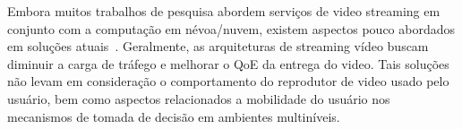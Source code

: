 Embora muitos trabalhos de pesquisa abordem serviços de video streaming em conjunto com a computação em névoa/nuvem, existem aspectos pouco abordados em soluções atuais~\cite{Mouradian2018ComSurv, bentaleb:2018:MSys}. Geralmente, as arquiteturas de streaming vídeo buscam diminuir a carga de tráfego e melhorar o QoE da entrega do video.
Tais soluções não levam em consideração o comportamento do reprodutor de video usado pelo usuário, bem como aspectos relacionados a mobilidade do usuário nos mecanismos de tomada de decisão em ambientes multiníveis. 





